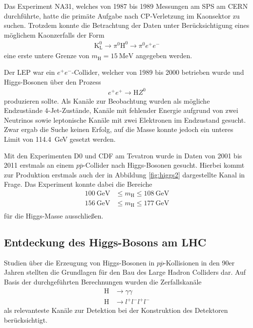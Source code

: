 
Das Experiment NA31, welches von 1987 bis 1989 Messungen am SPS am CERN durchführte, hatte die primäte Aufgabe nach CP-Verletzung im Kaonsektor zu suchen.
Trotzdem konnte die Betrachtung der Daten unter Berücksichtigung eines möglichem Kaonzerfalls der Form
\begin{align*}
	\text{K}_\text{L}^0 \rightarrow \pi^0 \text{H}^0 \rightarrow \pi^0 e^+ e^-
\end{align*}
eine erste untere Grenze von $m_\text{H} = \SI{15}{\mega\electronvolt}$ angegeben werden.

Der LEP war ein $e^+ e^-$-Collider, welcher von 1989 bis 2000 betrieben wurde und Higgs-Bosonen über den Prozess
\begin{align*}
	e^+ e^+ \rightarrow \text{H} Z^0
\end{align*}
produzieren sollte.
Als Kanäle zur Beobachtung wurden als mögliche Endzustände 4-Jet-Zustände, Kanäle mit fehlender Energie aufgrund von zwei Neutrinos sowie leptonische Kanäle mit zwei Elektronen im Endzustand gesucht.
Zwar ergab die Suche keinen Erfolg, auf die Masse konnte jedoch ein unteres Limit von \SI{114.4}{\giga\electronvolt} gesetzt werden.

Mit den Experimenten D0 und CDF am Tevatron wurde in Daten von 2001 bis 2011 erstmals an einem $p\overline{p}$-Collider nach Higgs-Bosonen gesucht.
Hierbei kommt zur Produktion erstmals auch der in Abbildung \ref{fig:higgs2} dargestellte Kanal in Frage.
Das Experiment konnte dabei die Bereiche
\begin{align*}
	\SI{100}{\giga\electronvolt} &\leq m_\text{H} \leq \SI{108}{\giga\electronvolt} \\
	\SI{156}{\giga\electronvolt} &\leq m_\text{H} \leq \SI{177}{\giga\electronvolt} \\
\end{align*}
für die Higgs-Masse ausschließen.

\subsection{Entdeckung des Higgs-Bosons am LHC}

Studien über die Erzeugung von Higgs-Bosonen in $p\overline{p}$-Kollisionen in den 90er Jahren stellten die Grundlagen für den Bau des Large Hadron Colliders dar.
Auf Basis der durchgeführten Berechnungen wurden die Zerfallskanäle
\begin{align*}
	\text{H} &\rightarrow \gamma \gamma \\
	\text{H} &\rightarrow l^+ l^- l^+ l^- 
\end{align*}
als relevanteste Kanäle zur Detektion bei der Konstruktion des Detektoren berücksichtigt.

